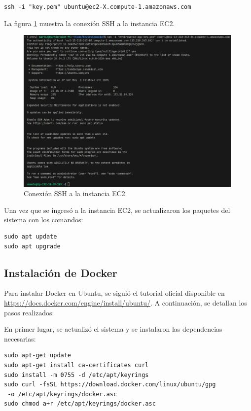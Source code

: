 \begin{verbatim}
ssh -i "key.pem" ubuntu@ec2-X.compute-1.amazonaws.com
\end{verbatim}

La figura \ref{fig:aws-ec2-ssh} muestra la conexión SSH a la instancia EC2.
\begin{figure}[H]
    \centering
    \includegraphics[width=0.99\textwidth]{./Images/33-ec2-2.png}
    \caption{Conexión SSH a la instancia EC2.}
    \label{fig:aws-ec2-ssh}
\end{figure}

Una vez que se ingresó a la instancia EC2, se actualizaron los paquetes del
sistema con los comandos:

\begin{verbatim}
sudo apt update
sudo apt upgrade
\end{verbatim}

\subsection{Instalación de Docker}
Para instalar Docker en Ubuntu, se siguió el tutorial oficial disponible en
\url{https://docs.docker.com/engine/install/ubuntu/}. A continuación, se
detallan los pasos realizados:

En primer lugar, se actualizó el sistema y se instalaron las dependencias
necesarias:

\begin{verbatim}
sudo apt-get update
sudo apt-get install ca-certificates curl
sudo install -m 0755 -d /etc/apt/keyrings
sudo curl -fsSL https://download.docker.com/linux/ubuntu/gpg
 -o /etc/apt/keyrings/docker.asc
sudo chmod a+r /etc/apt/keyrings/docker.asc
\end{verbatim}

